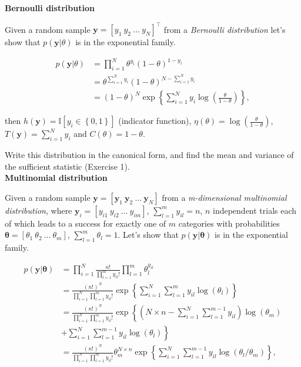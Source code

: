 \begin{enumerate}
\textbf{Bernoulli distribution}

Given a random sample $\bm{y}=[y_1 \ y_2 \ \dots \ y_N]^{\top}$ from a \textit{Bernoulli distribution} let's show that $p(\bm{y}|\theta)$ is in the exponential family.


\begin{align}
	p(\bm{y}|\theta)&=\prod_{i=1}^N \theta^{y_i}(1-\theta)^{1-y_i}\nonumber\\
	&=\theta^{\sum_{i=1}^N y_i}(1-\theta)^{N-\sum_{i=1}^N y_i}\nonumber\\
	&=(1-\theta)^N\exp\left\{\sum_{i=1}^N y_i\log\left(\frac{\theta}{1-\theta}\right)\right\}\nonumber,
\end{align}

then $h(\bm{y})=\mathbb{I}[y_i\in\left\{0,1\right\}]$ (indicator function), $\eta(\theta)=\log\left(\frac{\theta}{1-\theta}\right)$, $T(\bm{y})=\sum_{i=1}^N y_i$ and $C(\theta)=1-\theta$.

Write this distribution in the canonical form, and find the mean and variance of the sufficient statistic (Exercise 1).\\ 

\textbf{Multinomial distribution} 

Given a random sample $\bm{y}=[\bm{y}_1 \ \bm{y}_2 \ \dots \ \bm{y}_N]$ from a \textit{m-dimensional multinomial distribution}, where $\bm{y}_i=\left[y_{i1} \ y_{i2} \ \dots \ y_{im}\right]$, $\sum_{l=1}^m y_{il}=n$, $n$ independent trials each of which leads to a success for exactly one of $m$ categories with probabilities $\bm{\theta}=[\theta_1 \ \theta_2 \ \dots \ \theta_m]$, $\sum_{l=1}^m \theta_l=1$. Let's show that $p(\bm{y}|\bm{\theta})$ is in the exponential family.


\begin{align}
	p(\bm{y}|\bm{\theta})&=\prod_{i=1}^N \frac{n!}{\prod_{l=1}^m y_{il}!} \prod_{l=1}^m\theta_l^{y_{il}}\nonumber\\
	&=\frac{(n!)^N}{\prod_{i=1}^N\prod_{l=1}^m y_{il}!}\exp\left\{\sum_{i=1}^N\sum_{l=1}^m y_{il}\log(\theta_l)\right\}\nonumber\\
	&=\frac{(n!)^N}{\prod_{i=1}^N\prod_{l=1}^m y_{il}!}\exp\left\{\left(N\times n-\sum_{i=1}^N\sum_{l=1}^{m-1}y_{il}\right)\log(\theta_m)\nonumber\right. \\
	&\left.+\sum_{i=1}^N\sum_{l=1}^{m-1}y_{il}\log(\theta_l)\right\}\nonumber\\
	&=\frac{(n!)^N}{\prod_{i=1}^N\prod_{l=1}^m y_{il}!}\theta_m^{N\times n}\exp\left\{\sum_{i=1}^N\sum_{l=1}^{m-1}y_{il}\log(\theta_l/\theta_m)\right\}\nonumber,
\end{align}


\end{enumerate}

